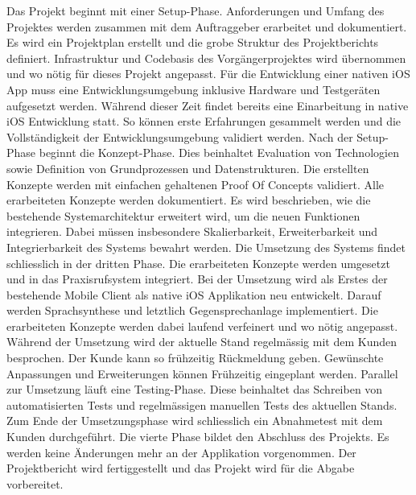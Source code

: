 Das Projekt beginnt mit einer Setup-Phase.
Anforderungen und Umfang des Projektes werden zusammen mit dem Auftraggeber erarbeitet und dokumentiert.
Es wird ein Projektplan erstellt und die grobe Struktur des Projektberichts definiert.
Infrastruktur und Codebasis des Vorgängerprojektes wird übernommen und wo nötig für dieses Projekt angepasst.
Für die Entwicklung einer nativen iOS App muss eine Entwicklungsumgebung inklusive Hardware und Testgeräten aufgesetzt werden.
Während dieser Zeit findet bereits eine Einarbeitung in native iOS Entwicklung statt.
So können erste Erfahrungen gesammelt werden und die Vollständigkeit der Entwicklungsumgebung validiert werden.
Nach der Setup-Phase beginnt die Konzept-Phase.
Dies beinhaltet Evaluation von Technologien sowie Definition von Grundprozessen und Datenstrukturen.
Die erstellten Konzepte werden mit einfachen gehaltenen Proof Of Concepts validiert.
Alle erarbeiteten Konzepte werden dokumentiert.
Es wird beschrieben, wie die bestehende Systemarchitektur erweitert wird, um die neuen Funktionen integrieren.
Dabei müssen insbesondere Skalierbarkeit, Erweiterbarkeit und Integrierbarkeit des Systems bewahrt werden.
Die Umsetzung des Systems findet schliesslich in der dritten Phase.
Die erarbeiteten Konzepte werden umgesetzt und in das Praxisrufsystem integriert.
Bei der Umsetzung wird als Erstes der bestehende Mobile Client als native iOS Applikation neu entwickelt.
Darauf werden Sprachsynthese und letztlich Gegensprechanlage implementiert.
Die erarbeiteten Konzepte werden dabei laufend verfeinert und wo nötig angepasst.
Während der Umsetzung wird der aktuelle Stand regelmässig mit dem Kunden besprochen.
Der Kunde kann so frühzeitig Rückmeldung geben.
Gewünschte Anpassungen und Erweiterungen können Frühzeitig eingeplant werden.
Parallel zur Umsetzung läuft eine Testing-Phase.
Diese beinhaltet das Schreiben von automatisierten Tests und regelmässigen manuellen Tests des aktuellen Stands.
Zum Ende der Umsetzungsphase wird schliesslich ein Abnahmetest mit dem Kunden durchgeführt.
Die vierte Phase bildet den Abschluss des Projekts.
Es werden keine Änderungen mehr an der Applikation vorgenommen.
Der Projektbericht wird fertiggestellt und das Projekt wird für die Abgabe vorbereitet.

